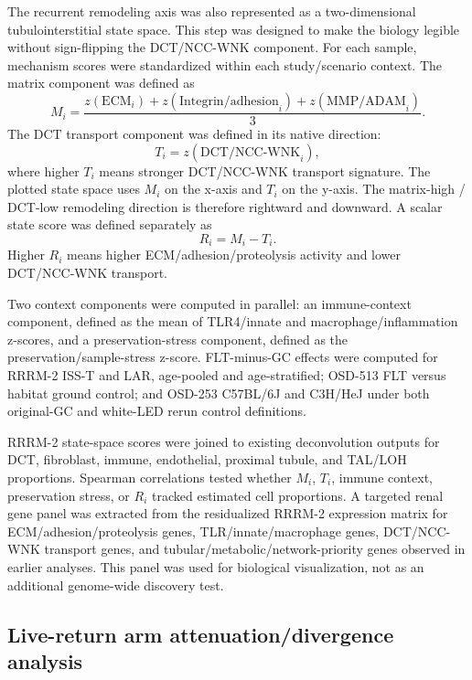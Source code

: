 \documentclass[11pt]{article}
\begin{document}
The recurrent remodeling axis was also represented as a two-dimensional tubulointerstitial state space. This step was designed to make the biology legible without sign-flipping the DCT/NCC-WNK component. For each sample, mechanism scores were standardized within each study/scenario context. The matrix component was defined as
\begin{equation}
M_i=\frac{z(\mathrm{ECM}_i)+z(\mathrm{Integrin/adhesion}_i)+z(\mathrm{MMP/ADAM}_i)}{3}.
\end{equation}
The DCT transport component was defined in its native direction:
\begin{equation}
T_i=z(\mathrm{DCT/NCC\mbox{-}WNK}_i),
\end{equation}
where higher $T_i$ means stronger DCT/NCC-WNK transport signature. The plotted state space uses $M_i$ on the x-axis and $T_i$ on the y-axis. The matrix-high / DCT-low remodeling direction is therefore rightward and downward. A scalar state score was defined separately as
\begin{equation}
R_i=M_i-T_i.
\end{equation}
Higher $R_i$ means higher ECM/adhesion/proteolysis activity and lower DCT/NCC-WNK transport.

Two context components were computed in parallel: an immune-context component, defined as the mean of TLR4/innate and macrophage/inflammation z-scores, and a preservation-stress component, defined as the preservation/sample-stress z-score. FLT-minus-GC effects were computed for RRRM-2 ISS-T and LAR, age-pooled and age-stratified; OSD-513 FLT versus habitat ground control; and OSD-253 C57BL/6J and C3H/HeJ under both original-GC and white-LED rerun control definitions.

RRRM-2 state-space scores were joined to existing deconvolution outputs for DCT, fibroblast, immune, endothelial, proximal tubule, and TAL/LOH proportions. Spearman correlations tested whether $M_i$, $T_i$, immune context, preservation stress, or $R_i$ tracked estimated cell proportions. A targeted renal gene panel was extracted from the residualized RRRM-2 expression matrix for ECM/adhesion/proteolysis genes, TLR/innate/macrophage genes, DCT/NCC-WNK transport genes, and tubular/metabolic/network-priority genes observed in earlier analyses. This panel was used for biological visualization, not as an additional genome-wide discovery test.

\subsection{Live-return arm attenuation/divergence analysis}
\end{document}
